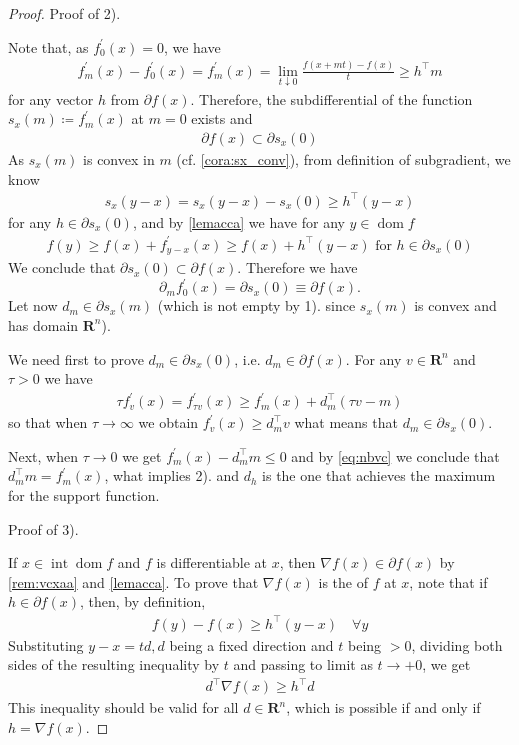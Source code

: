 \documentclass{article}
\newcommand{\inte}{\operatorname{int}}
\newcommand{\dom}{\operatorname{dom}}
\begin{document}
\begin{proof}
Proof of 2).

Note that, as $f_{0}^{\prime}(x)=0$, we have 
\begin{align}
f_{m}^{\prime}(x)-f_{0}^{\prime}(x)=f_{m}^{\prime}(x)=\lim _{t \downarrow 0} \frac{f(x+m t)-f(x)}{t} \geq h^{\top} m\label{eq:nbvc}
\end{align}
for any vector $h$ from $\partial f(x)$. Therefore, the subdifferential of the function $s_x(m)\coloneqq f_{m}^{\prime}(x)$ at $m=0$ exists and
\begin{align*}
\partial f(x) \subset \partial s_x(0)
\end{align*}
As $s_x(m)$ is convex in $m$ (cf. \cref{cora:sx_conv}), from definition of subgradient, we know
\begin{align*}
s_x(y-x)=s_x(y-x)-s_x(0) \geq h^{\top}(y-x)
\end{align*}
for any $h \in \partial s_x(0)$, and by \cref{lemacca} we have for any $y \in \dom  f$
\begin{align*}
f(y) \geq f(x)+f_{y-x}^{\prime}(x) \geq f(x)+h^{\top}(y-x) \text { for } h\in \partial  s_x(0)
\end{align*}
We conclude that $\partial  s_x(0) \subset \partial f(x)$. Therefore we have  $$\partial_{m} f_{0}^{\prime}(x)=\partial  s_x(0)   \equiv \partial f(x).$$
Let now $d_{m} \in \partial s_x(m)$ (which is not empty by 1). since $s_x(m)$ is convex and has domain $\mathbf{R}^n$). 

We need first to prove $d_{m} \in \partial s_x(0)$, i.e. $d_{m} \in \partial f(x)$. For any $v \in \mathbf{R}^{n}$ and $\tau>0$ we have
\begin{align*}
\tau f_{v}^{\prime}(x)=f_{\tau v}^{\prime}(x) \geq f_{m}^{\prime}(x)+d_{m}^{\top}(\tau v-m)
\end{align*}
so that when $\tau \rightarrow \infty$ we obtain $f_{v}^{\prime}(x) \geq d_{m}^{\top} v$ what means that $d_{m} \in \partial s_x(0)$.

Next, when $\tau \rightarrow 0$ we get $f_{m}^{\prime}(x)-d_{m}^{\top} m \leq 0$ and by \cref{eq:nbvc} we conclude that $d_{m}^{\top} m=f_{m}^{\prime}(x)$, what implies 2). and $d_h$ is the one that achieves the maximum for the support function. 

Proof of 3).

If $x \in\inte \dom f$ and $f$ is differentiable at $x$, then $\nabla f(x) \in \partial f(x)$ by \cref{rem:vcxaa} and \cref{lemacca}. To prove that $\nabla f(x)$ is the  of $f$ at $x$, note that if $h \in \partial f(x)$, then, by definition,
\begin{align*}
f(y)-f(x) \geq h^{\top}(y-x) \quad \forall y
\end{align*}
Substituting $y-x=t d, d$ being a fixed direction and $t$ being $>0$, dividing both sides of the resulting inequality by $t$ and passing to limit as $t \rightarrow+0$, we get
\begin{align*}
d^{\top} \nabla f(x) \geq h^{\top} d
\end{align*}
This inequality should be valid for all $d \in \mathbf{R}^{n}$, which is possible if and only if $h=\nabla f(x)$.
\end{proof}
\end{document}
